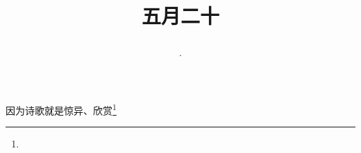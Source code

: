 \title{\date[d=25,m=6,y=2024][year:cn-y,年,month:cn,day:cn,日,·,weekday]·五月二十 }
因为诗歌就是惊异、欣赏\footnote{ }

